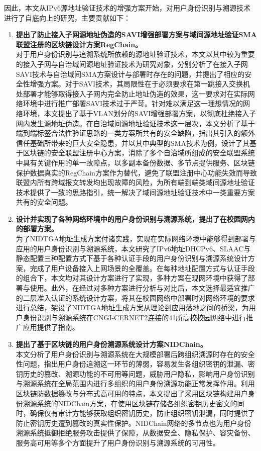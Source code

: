   因此，本文从IPv6源地址验证技术的增强方案开始，对用户身份识别与溯源技术进行了自底向上的研究，主要贡献如下：
  \begin{enumerate}[1{)}]
    \item \textbf{提出了防止接入子网源地址伪造的SAVI增强部署方案与域间源地址验证SMA联盟注册的区块链设计方案RegChain。} \\
      对于用户身份识别与追溯系统所依赖的源地址验证技术，本文以其中较为重要的接入子网与自治域间源地址验证技术为研究对象，分别分析了在接入子网SAVI技术与自治域间SMA方案设计与部署时存在的问题，并提出了相应的安全性增强方案。对于SAVI技术，其局限性在于必须要求在第一跳接入交换机处部署才能够取得接入子网内完全防止地址伪造的效果，这一要求对在实际网络环境中进行推广部署SAVI技术过于严苛。针对难以满足这一理想情况的网络环境，本文提出了基于VLAN划分的SAVI增强部署方案，以彻底杜绝接入子网内发生源地址伪造。在自治域间源地址验证技术这一层次，本文分析了基于端到端标签合法性验证思路的一类方案所共有的安全缺陷，指出其引入的额外信任基础所带来的巨大安全隐患，并以其中典型的SMA技术为例，设计了其基于区块链的安全联盟注册中心方案，消除了多个自治域所组成的安全联盟系统中具有关键作用的单一故障点，以多副本备份数据、多节点提供服务、区块链保护数据真实的RegChain方案作为替代，避免了联盟注册中心功能失效而导致联盟内所有跨域报文转发均出现故障的风险，为所有端到端类域间源地址验证技术提供了一致的思路指引，统一解决了域间源地址验证技术中一类重要方案共有的安全问题。
    \item \textbf{设计并实现了各种网络环境中的用户身份识别与溯源系统，提出了在校园网内的部署方案。} \\
      为了NIDTGA地址生成方案付诸实践，实现在实际网络环境中能够得到部署与应用的用户身份识别与溯源系统，本文研究了IPv6地址DHCPv6、SLAAC与静态配置三种配置方式下基于各种认证手段的用户身份识别与溯源系统设计方案，完成了用户设备接入上网场景的全覆盖。在每种地址配置方式与认证手段的组合下，本文均对其设计方案进行了实现，多种方案在现网环境中获得了部署与使用。此外，在经过对多种方案进行分析与对比后，本文选择最适宜推广的二层准入认证的系统设计方案，将其在校园网络中部署时对网络环境的要求进行总结，架设了NIDTGA地址生成方案从理论到应用落地之间的桥梁，为用户身份识别与溯源系统在CNGI-CERNET2连接的41所高校校园网络中进行推广应用提供了指南。
    \item \textbf{提出了基于区块链的用户身份溯源系统设计方案NIDChain。} \\
      本文分析了用户身份识别与溯源系统在大规模部署后跨组织溯源时存在的安全性问题，指出用户身份追溯这一环节的薄弱，容易发生各组织密钥的泄漏、密钥历史的篡改、溯源功能的不可用等问题，威胁用户隐私，影响用户身份识别与溯源系统在全局范围内进行多组织的用户身份溯源功能正常发挥作用。利用区块链防数据篡改与分布式高可用的特点，本文提出了采用区块链构建用户身份溯源系统的NIDChain方案，在使用区块链存储各组织密钥历史密文的同时，确保仅有审计方能够获取组织密钥历史，防止组织密钥泄漏，同时提供了防止密钥历史遭到篡改的真实性保护。NIDChain网络的多节点也为用户身份溯源系统抵御拒绝服务攻击提供了保障，从数据安全、隐私保护、容灾备份、服务高可用等多个方面提升了用户身份识别与溯源系统的可用性。
  \end{enumerate}


